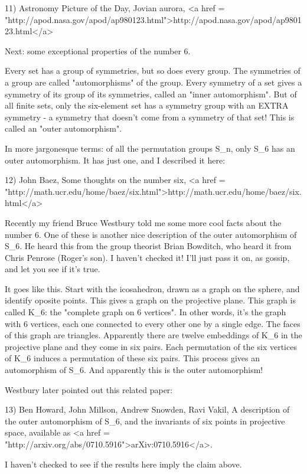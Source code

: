 11) Astronomy Picture of the Day, Jovian aurora,
<a href = "http://apod.nasa.gov/apod/ap980123.html">http://apod.nasa.gov/apod/ap980123.html</a>

Next: some exceptional properties of the number 6.

Every set has a group of symmetries, but so does every group.  The
symmetries of a group are called "automorphisms" of the
group.  Every symmetry of a set gives a symmetry of its group of its
symmetries, called an "inner automorphism".  But of all
finite sets, only the six-element set has a symmetry group with an
EXTRA symmetry - a symmetry that doesn't come from a symmetry of that
set!  This is called an "outer automorphism".

In more jargonesque terms: of all the permutation groups
S_{n}, only S_{6} has an outer automorphism.  It has
just one, and I described it here:

12) John Baez, Some thoughts on the number six, <a href = "http://math.ucr.edu/home/baez/six.html">http://math.ucr.edu/home/baez/six.html</a>

Recently my friend Bruce Westbury told me some more cool facts about 
the number 6.  One of these is another nice description of the outer
automorphism of S_{6}.  He heard this from the group theorist Brian Bowditch, who heard it from Chris Penrose (Roger's son).  I haven't
checked it!  I'll just pass it on, as gossip, and let you see if it's true.

It goes like this.  Start with the icosahedron, drawn as a graph on
the sphere, and identify oposite points.  This gives a graph on the 
projective plane.  This graph is called K_{6}: the "complete graph on 6 vertices".  In other words, it's the graph with 6 vertices, each one
connected to every other one by a single edge.   The faces of this 
graph are triangles.  Apparently there are twelve embeddings of K_{6} 
in the projective plane and they come in six pairs.  Each permutation 
of the six vertices of K_{6} induces a permutation of these six pairs. 
This process gives an automorphism of S_{6}.  And apparently this is the
outer automorphism!

Westbury later pointed out this related paper:

13) Ben Howard, John Millson, Andrew Snowden, Ravi Vakil, A 
description of the outer automorphism of S_{6}, and the invariants 
of six points in projective space, available as <a href = "http://arxiv.org/abs/0710.5916">arXiv:0710.5916</a>.

I haven't checked to see if the results here imply the claim above.

